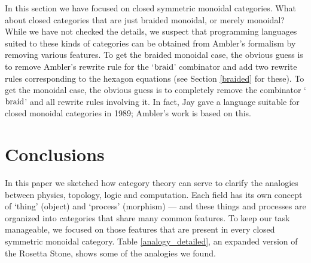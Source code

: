 \documentclass[12pt]{article}
\newcommand{\braid}{{\rm braid}}
\begin{document}
In this section we have focused on closed symmetric monoidal
categories.  What about closed categories that are just braided
monoidal, or merely monoidal?  While we have not checked the details,
we suspect that programming languages suited to these kinds of
categories can be obtained from Ambler's formalism by removing various
features.  To get the braided monoidal case, the obvious guess is to
remove Ambler's rewrite rule for the `$\braid$' combinator
and add two rewrite rules corresponding to the hexagon equations (see
Section \ref{braided} for these).  To get the monoidal case, the
obvious guess is to completely remove the combinator `$\braid$' and
all rewrite rules involving it.  In fact, Jay \cite{Jay1989} gave 
a language suitable for closed monoidal categories in 1989; Ambler's
work is based on this.  

\section{Conclusions}
\label{conclusions}

In this paper we sketched how category theory can serve to clarify the
analogies between physics, topology, logic and computation.  Each
field has its own concept of `thing' (object) and `process' (morphism)
--- and these things and processes are organized into categories that
share many common features.  To keep our task manageable, we focused
on those features that are present in every closed symmetric monoidal
category.  Table \ref{analogy_detailed}, an expanded version of the
Rosetta Stone, shows some of the analogies we found.
\end{document}
